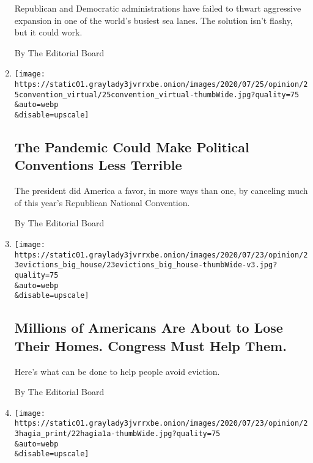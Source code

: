 \begin{enumerate}
  Republican and Democratic administrations have failed to thwart
  aggressive expansion in one of the world's busiest sea lanes. The
  solution isn't flashy, but it could work.

  By The Editorial Board
\item
  \href{/2020/07/25/opinion/sunday/republican-convention-trump.html}{}

  \texttt{[image: https://static01.graylady3jvrrxbe.onion/images/2020/07/25/opinion/25convention\_virtual/25convention\_virtual-thumbWide.jpg?quality=75\\\&auto=webp\\\&disable=upscale]}

  \hypertarget{the-pandemic-could-make-political-conventions-less-terrible}{%
  \subsection{The Pandemic Could Make Political Conventions Less
  Terrible}\label{the-pandemic-could-make-political-conventions-less-terrible}}

  The president did America a favor, in more ways than one, by canceling
  much of this year's Republican National Convention.

  By The Editorial Board
\item
  \href{/2020/07/23/opinion/coronavirus-evictions-rent.html}{}

  \texttt{[image: https://static01.graylady3jvrrxbe.onion/images/2020/07/23/opinion/23evictions\_big\_house/23evictions\_big\_house-thumbWide-v3.jpg?quality=75\\\&auto=webp\\\&disable=upscale]}

  \hypertarget{millions-of-americans-are-about-to-lose-their-homes-congress-must-help-them}{%
  \subsection{Millions of Americans Are About to Lose Their Homes.
  Congress Must Help
  Them.}\label{millions-of-americans-are-about-to-lose-their-homes-congress-must-help-them}}

  Here's what can be done to help people avoid eviction.

  By The Editorial Board
\item
  \href{/2020/07/22/opinion/hagia-sophia-mosque.html}{}

  \texttt{[image: https://static01.graylady3jvrrxbe.onion/images/2020/07/23/opinion/23hagia\_print/22hagia1a-thumbWide.jpg?quality=75\\\&auto=webp\\\&disable=upscale]}

  \hypertarget{the-hagia-sophia-was-a-cathedral-a-mosque-and-a-museum-its-converting-again}{%
}
\end{enumerate}
